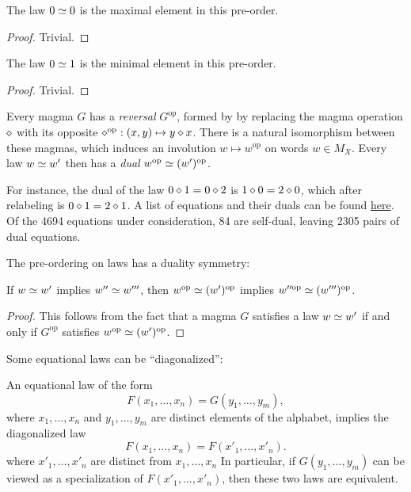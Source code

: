 \begin{lemma}\label{maximal}  The law $0  \simeq  0$ is the maximal element in this pre-order.
\end{lemma}

\begin{proof} Trivial.
\end{proof}

\begin{lemma}\label{minimal}  The law $0  \simeq  1$ is the minimal element in this pre-order.
\end{lemma}

\begin{proof} Trivial.
\end{proof}

Every magma $G$ has a \emph{reversal} $G^{\mathrm{op}}$, formed by by replacing the magma operation $\diamond$ with its opposite $\diamond^{\mathrm{op}}:(x,y) \mapsto y \diamond x$. There is a natural isomorphism between these magmas, which induces an involution $w \mapsto w^{\mathrm{op}}$ on words $w \in M_X$.  Every law $w  \simeq  w'$ then has a \emph{dual} $w^{\mathrm{op}}  \simeq  (w')^{\mathrm{op}}$.

For instance, the dual of the law $0 \diamond 1 = 0 \diamond 2$ is $1 \diamond 0 = 2 \diamond 0$, which after relabeling is $0 \diamond 1 = 2 \diamond 1$.  A list of equations and their duals can be found \href{https://github.com/teorth/equational_theories/blob/main/data/dual_equations.md}{here}.  Of the 4694 equations under consideration, 84 are self-dual, leaving 2305 pairs of dual equations.

The pre-ordering on laws has a duality symmetry:

\begin{lemma}\label{duality}  If $w  \simeq  w'$ implies $w''  \simeq  w'''$, then $w^{\mathrm{op}}  \simeq  (w')^{\mathrm{op}}$ implies $w''^{\mathrm{op}}  \simeq  (w''')^{\mathrm{op}}$.
\end{lemma}

\begin{proof} This follows from the fact that a magma $G$ satisfies a law $w  \simeq  w'$ if and only if $G^{\mathrm{op}}$ satisfies $w^{\mathrm{op}}  \simeq  (w')^{\mathrm{op}}$.
\end{proof}

Some equational laws can be ``diagonalized'':

\begin{theorem}[Diagonalization]\label{diag}  An equational law of the form
  \begin{equation}\label{prediag} F(x_1,\dots,x_n) = G(y_1,\dots,y_m),
  \end{equation}
  where $x_1,\dots,x_n$ and $y_1,\dots,y_m$ are distinct elements of the alphabet, implies the diagonalized law
$$ F(x_1,\dots,x_n) = F(x'_1,\dots,x'_n).$$
where $x'_1,\dots,x'_n$ are distinct from $x_1,\dots,x_n$
In particular, if $G(y_1,\dots,y_m)$ can be viewed as a specialization of $F(x'_1,\dots,x'_n)$, then these two laws are equivalent.
\end{theorem}

